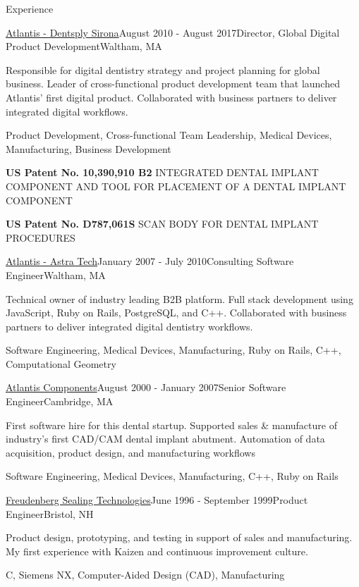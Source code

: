 \documentclass{resume}
\begin{document}
\begin{rSection}{Experience}
\begin{rSubsection}{\href{https://dentsplysirona.com}{Atlantis - Dentsply Sirona}}{August 2010 - August 2017}{Director, Global Digital Product Development}{Waltham, MA}
\item Responsible for digital dentistry strategy and project planning for global business. Leader of cross-functional product development team that launched Atlantis' first digital product. Collaborated with business partners to deliver integrated digital workflows.
\item Product Development, Cross-functional Team Leadership, Medical Devices, Manufacturing, Business Development
\item \textbf{US Patent No. 10,390,910 B2} INTEGRATED DENTAL IMPLANT COMPONENT AND TOOL FOR PLACEMENT OF A DENTAL IMPLANT COMPONENT
\item \textbf{US Patent No. D787,061S} SCAN BODY FOR DENTAL IMPLANT PROCEDURES
\end{rSubsection}

\begin{rSubsection}{\href{https://dentsplysirona.com}{Atlantis - Astra Tech}}{January 2007 - July 2010}{Consulting Software Engineer}{Waltham, MA}
\item Technical owner of industry leading B2B platform. Full stack development using JavaScript, Ruby on Rails, PostgreSQL, and C++. Collaborated with business partners to deliver integrated digital dentistry workflows.
\item Software Engineering, Medical Devices, Manufacturing, Ruby on Rails, C++, Computational Geometry
\end{rSubsection}

\begin{rSubsection}{\href{https://dentsplysirona.com}{Atlantis Components}}{August 2000 - January 2007}{Senior Software Engineer}{Cambridge, MA}
\item First software hire for this dental startup. Supported sales \& manufacture of industry's first CAD/CAM dental implant abutment. Automation of data acquisition, product design, and manufacturing workflows
\item Software Engineering, Medical Devices, Manufacturing, C++, Ruby on Rails
\end{rSubsection}

\begin{rSubsection}{\href{https://fst.com}{Freudenberg Sealing Technologies}}{June 1996 - September 1999}{Product Engineer}{Bristol, NH}
\item Product design, prototyping, and testing in support of sales and manufacturing. My first experience with Kaizen and continuous improvement culture.
\item C, Siemens NX, Computer-Aided Design (CAD), Manufacturing
\end{rSubsection}

\end{rSection}
\end{document}
